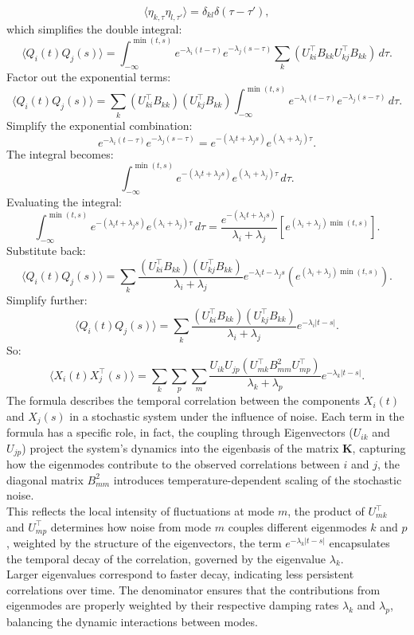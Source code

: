 \documentclass[English, Lau, oneside]{sapthesis}
\begin{document}
\[
\langle \eta_{k,\tau} \eta_{l,\tau'} \rangle = \delta_{kl} \delta(\tau - \tau'),
\]
which simplifies the double integral:
\[
\langle Q_i(t) Q_j(s) \rangle = \int_{-\infty}^{\min(t,s)} e^{-\lambda_i (t - \tau)} e^{-\lambda_j (s - \tau)} \sum_k (U_{ki}^\top B_{kk} U_{kj}^\top B_{kk}) \, d\tau.
\]
Factor out the exponential terms:
\[
\langle Q_i(t) Q_j(s) \rangle = \sum_k (U_{ki}^\top B_{kk}) (U_{kj}^\top B_{kk}) \int_{-\infty}^{\min(t,s)} e^{-\lambda_i (t - \tau)} e^{-\lambda_j (s - \tau)} \, d\tau.
\]
Simplify the exponential combination:
\[
e^{-\lambda_i (t - \tau)} e^{-\lambda_j (s - \tau)} = e^{-(\lambda_i t + \lambda_j s)} e^{(\lambda_i + \lambda_j) \tau}.
\]
The integral becomes:
\[
\int_{-\infty}^{\min(t,s)} e^{-(\lambda_i t + \lambda_j s)} e^{(\lambda_i + \lambda_j) \tau} \, d\tau.
\]
Evaluating the integral:
\[
\int_{-\infty}^{\min(t,s)} e^{-(\lambda_i t + \lambda_j s)} e^{(\lambda_i + \lambda_j) \tau} \, d\tau = \frac{e^{-(\lambda_i t + \lambda_j s)}}{\lambda_i + \lambda_j} \left[ e^{(\lambda_i + \lambda_j) \min(t,s)} \right].
\]
Substitute back:
\[
\langle Q_i(t) Q_j(s) \rangle = \sum_k \frac{(U_{ki}^\top B_{kk}) (U_{kj}^\top B_{kk})}{\lambda_i + \lambda_j} e^{-\lambda_i t - \lambda_j s} \left( e^{(\lambda_i + \lambda_j) \min(t,s)} \right).
\]
Simplify further:
\[
\langle Q_i(t) Q_j(s) \rangle = \sum_k \frac{(U_{ki}^\top B_{kk}) (U_{kj}^\top B_{kk})}{\lambda_i + \lambda_j} e^{-\lambda_i |t-s|}.
\]
So:
\[
\langle X_i(t) X_j^\top(s) \rangle = \sum_k \sum_p \sum_m \frac{U_{ik} U_{jp} (U_{mk}^\top B_{mm}^2 U_{mp}^\top)}{\lambda_k + \lambda_p} e^{-\lambda_k |t-s|}.
\]
The formula describes the temporal correlation between the components \( X_i(t) \) and \( X_j(s) \) in a stochastic system under the influence of noise. Each term in the formula has a specific role, in fact, the coupling through Eigenvectors (\( U_{ik} \) and \( U_{jp} \)) project the system's dynamics into the eigenbasis of the matrix \( \mathbf{K} \), capturing how the eigenmodes contribute to the observed correlations between \( i \) and \( j \), the diagonal matrix \( B_{mm}^2 \) introduces temperature-dependent scaling of the stochastic noise.\\
This reflects the local intensity of fluctuations at mode \( m \), the product of \( U_{mk}^\top \) and \( U_{mp}^\top \) determines how noise from mode \( m \) couples different eigenmodes \( k \) and \( p \), weighted by the structure of the eigenvectors, the term \( e^{-\lambda_k |t-s|} \) encapsulates the temporal decay of the correlation, governed by the eigenvalue \( \lambda_k \).\\ 
Larger eigenvalues correspond to faster decay, indicating less persistent correlations over time.
The denominator ensures that the contributions from eigenmodes are properly weighted by their respective damping rates \( \lambda_k \) and \( \lambda_p \), balancing the dynamic interactions between modes.
\end{document}
